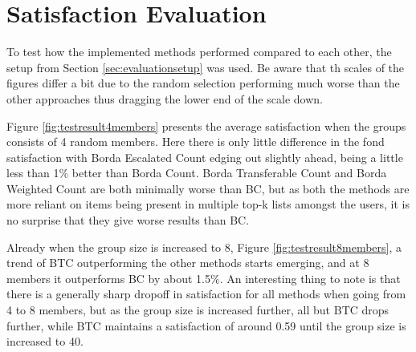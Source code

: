 \section{Satisfaction Evaluation} \label{sec:satisfationevaluation}

To test how the implemented methods performed compared to each other, the setup from Section \ref{sec:evaluationsetup} was used. Be aware that th scales of the figures differ a bit due to the random selection performing much worse than the other approaches thus dragging the lower end of the scale down.

Figure \ref{fig:testresult4members} presents the average satisfaction when the groups consists of 4 random members. Here there is only little difference in the fond satisfaction with Borda Escalated Count edging out slightly ahead, being a little less than 1\% better than Borda Count. Borda Transferable Count and Borda Weighted Count are both minimally worse than BC, but as both the methods are more reliant on items being present in multiple top-k lists amongst the users, it is no surprise that they give worse results than BC.

Already when the group size is increased to 8, Figure \ref{fig:testresult8members}, a trend of BTC outperforming the other methods starts emerging, and at 8 members it outperforms BC by about 1.5\%. An interesting thing to note is that there is a generally sharp dropoff in satisfaction for all methods when going from 4 to 8 members, but as the group size is increased further, all but BTC drops further, while BTC maintains a satisfaction of around 0.59 until the group size is increased to 40.

